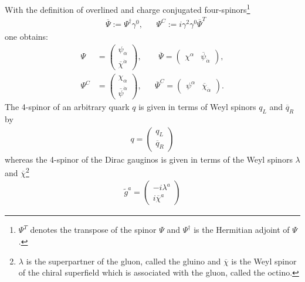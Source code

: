  
With the definition of overlined and charge conjugated four-spinors\footnote{$\Psi^T$ denotes the transpose of the spinor $\Psi$ and $\Psi^\dagger$ is the Hermitian adjoint of $\Psi$.}
\begin{align}
&\overline{\Psi} := \Psi^\dagger \gamma^0, && \Psi^C := i\gamma^2\gamma^0 \overline{\Psi}^T  
\end{align}
one obtains:
\begin{align}
\Psi &= \begin{pmatrix}
\psi_\alpha \\
\overline{\chi}^{\dot{\alpha}}
\end{pmatrix}, && \ \ 
\overline{\Psi} = \begin{pmatrix}
\chi^\alpha & \overline{\psi}_{\dot{\alpha}}
\end{pmatrix},\nonumber\\
\Psi^C &= \begin{pmatrix}
\chi_\alpha \\
\overline{\psi}^{\dot{\alpha}}
\end{pmatrix}, && 
\overline{\Psi}^C = \begin{pmatrix}
\psi^\alpha & \overline{\chi}_{\dot{\alpha}}
\end{pmatrix}.
\end{align}
The 4-spinor of an arbitrary quark $q$ is given in terms of Weyl spinors $q_L$ and $\overline{q}_R$ by
\begin{align}
q = \begin{pmatrix}
q_L \\
\overline{q}_R
\end{pmatrix}
\end{align}
whereas the 4-spinor of the Dirac gauginos is given in terms of the Weyl spinors $\lambda$ and $\overline{\chi}$\footnote{$\lambda$ is the superpartner of the gluon, called the gluino and $\overline{\chi}$ is the Weyl spinor of the chiral superfield which is associated with the gluon, called the octino.}
\begin{align}
\tilde{g}^a = \begin{pmatrix}
-i \lambda^a \\
i \overline{\chi}^a
\end{pmatrix}
\end{align}

